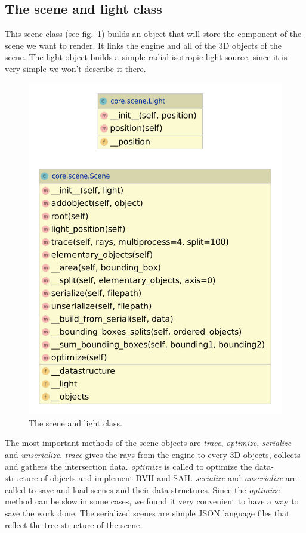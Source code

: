 \documentclass[a4paper,11pt]{article}%
\begin{document}
\subsection*{The scene and light class}
This scene class (see fig.~\ref{fig:scene}) builds an object that will store the component of the scene we want to render.
It links the engine and all of the 3D objects of the scene.
The light object builds a simple radial isotropic light source, since it is very simple we won't describe it there.
\begin{figure}[h]
    \centering
    \includegraphics[scale=0.3]{img/scene.pdf}
    \caption{The scene and light class.}
    \label{fig:scene}
\end{figure}
The most important methods of the scene objects are \emph{trace}, \emph{optimize}, \emph{serialize} and \emph{unserialize}.
\emph{trace} gives the rays from the engine to every 3D objects, collects and gathers the intersection data.
\emph{optimize} is called to optimize the data-structure of objects and implement BVH and SAH.
\emph{serialize} and \emph{unserialize} are called to save and load scenes and their data-structures.
Since the \emph{optimize} method can be slow in some cases, we found it very convenient to have a way to save the work done.
The serialized scenes are simple JSON language files that reflect the tree structure of the scene.
\end{document}
